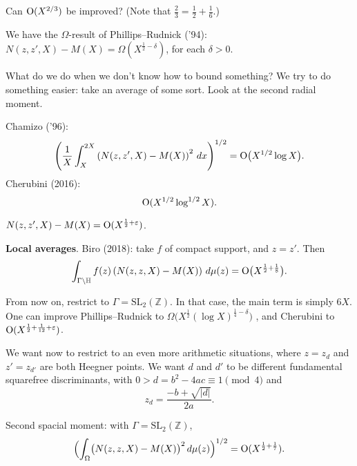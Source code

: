 \documentclass[reqno]{amsart} 
\begin{document}
\begin{question}
  Can $\operatorname{O}(X^{2/3})$ be improved?  (Note that $\tfrac{2}{3} = \tfrac{1}{2} + \tfrac{1}{6}$.)
\end{question}

We have the $\Omega$-result of Phillips--Rudnick ('94): $N(z, z', X) - M(X) = \Omega(X^{\frac{1}{2} - \delta})$, for each $\delta > 0$.

What do we do when we don't know how to bound something?  We try to do something easier: take an average of some sort.  Look at the second radial moment.

Chamizo ('96):
\begin{equation*}
  \left( \frac{1}{X} \int_X^{2 X} \left( N(z, z', X) - M(X) \right)^2 \, d x  \right)^{1/2}
  = \operatorname{O}\bigl(
  X^{1/2} \log X\bigr).
\end{equation*}
Cherubini (2016):
\begin{equation}\label{eq:cq6vse71xz}
  \operatorname{O}(X^{1/2} \log^{1/2} X).
\end{equation}

\begin{conjecture}
  $N(z, z', X) - M(X) = \operatorname{O}(X^{\frac{1}{2} + \varepsilon})$.
\end{conjecture}

\textbf{Local averages}.  Biro (2018): take $f$ of compact support, and $z = z '$.  Then
\begin{equation*}
  \int_{\Gamma \backslash \mathbb{H}}
  f(z) \left( N(z, z, X) - M(X) \right)
  \, d \mu(z)
  = \operatorname{O}\bigl(X^{\frac{1}{2} + \frac{1}{8}}\bigr).
\end{equation*}

From now on, restrict to $\Gamma = \mathrm{SL}_2(\mathbb{Z})$.  In that case, the main term is simply $6 X$.  One can improve Phillips--Rudnick to $\Omega\bigl(X^{\frac{1}{2}}(\log X)^{\frac{1}{4} - \delta}\bigr)$ , and Cherubini to $\operatorname{O}(X^{\frac{1}{2} + \frac{1}{12} + \varepsilon})$.

We want now to restrict to an even more arithmetic situations, where $z = z_d$ and $z ' = z_{d '}$ are both Heegner points.  We want $d$ and $d'$ to be different fundamental squarefree discriminants, with $0 > d = b^2 - 4 a c \equiv 1 \pmod{4}$ and
\begin{equation*}
  z_d = \frac{- b + \sqrt{\lvert d \rvert}}{2 a}.
\end{equation*}
\begin{theorem}
  Second spacial moment: with $\Gamma = \mathrm{SL}_2(\mathbb{Z})$,
  \begin{equation*}
    \Bigl( \int_{\Omega} \bigl( N(z, z, X) - M(X) \bigr)^2 \, d \mu(z) \Bigr)^{1/2} = \operatorname{O}(X^{\frac{1}{2} + \frac{1}{7}}).
  \end{equation*}  
\end{theorem}
\end{document}

